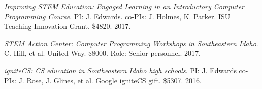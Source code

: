 \documentclass[margin,line]{res}
\begin{document}
\begin{resume}

\textit{Improving STEM Education: Engaged Learning in an Introductory  Computer Programming Course}. PI: \underline{J. Edwards}. co-PIs: J. Holmes, K. Parker. ISU Teaching Innovation Grant. \$4820. 2017.

\textit{STEM Action Center: Computer Programming Workshops in Southeastern Idaho}. C. Hill, et al. United Way. \$8000. Role: Senior personnel. 2017.

\textit{igniteCS: CS education in Southeastern Idaho high schools}. PI: \underline{J. Edwards} co-PIs: J. Rose, J. Glines, et al. Google igniteCS gift. \$5307. 2016.







\end{resume}
\end{document}
